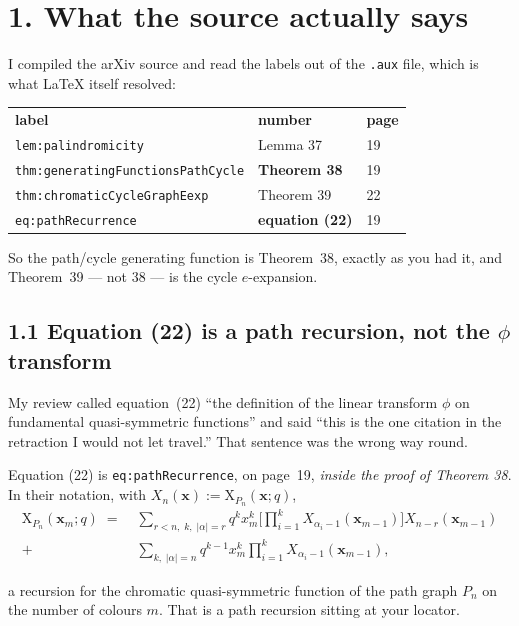 \documentclass[11pt,a4paper]{article}
\begin{document}
\section*{1. What the source actually says}

I compiled the arXiv source and read the labels out of the \texttt{.aux} file, which
is what \LaTeX{} itself resolved:

\begin{center}
\begin{tabular}{lll}
\textbf{label} & \textbf{number} & \textbf{page}\\[2pt]
\texttt{lem:palindromicity}                & Lemma 37   & 19\\
\texttt{thm:generatingFunctionsPathCycle}  & \textbf{Theorem 38} & 19\\
\texttt{thm:chromaticCycleGraphEexp}       & Theorem 39 & 22\\
\texttt{eq:pathRecurrence}                 & \textbf{equation (22)} & 19\\
\end{tabular}
\end{center}

So the path/cycle generating function is Theorem~38, exactly as you had it, and
Theorem~39 --- not 38 --- is the cycle $e$-expansion.

\subsection*{1.1 Equation (22) is a path recursion, not the $\phi$ transform}

My review called equation~(22) ``the definition of the linear transform $\phi$ on
fundamental quasi-symmetric functions'' and said ``this is the one citation in the
retraction I would not let travel.'' That sentence was the wrong way round.

Equation (22) is \texttt{eq:pathRecurrence}, on page~19, \emph{inside the proof of
Theorem 38}. In their notation, with
$X_n(\mathbf x) := \mathrm{X}_{P_n}(\mathbf x;q)$,
\[
\begin{aligned}
\mathrm{X}_{P_n}(\mathbf x_m;q) \;=\;
& \sum_{r<n,\;k,\;|\alpha|=r} q^k x_m^k
  \Big[\textstyle\prod_{i=1}^k X_{\alpha_i-1}(\mathbf x_{m-1})\Big]
  X_{n-r}(\mathbf x_{m-1})\\
+\; & \sum_{k,\;|\alpha|=n} q^{k-1} x_m^k
  \textstyle\prod_{i=1}^k X_{\alpha_i-1}(\mathbf x_{m-1}),
\end{aligned}
\]

a recursion for the chromatic quasi-symmetric function of the path graph $P_n$ on the
number of colours $m$. That is a path recursion sitting at your locator.
\end{document}
